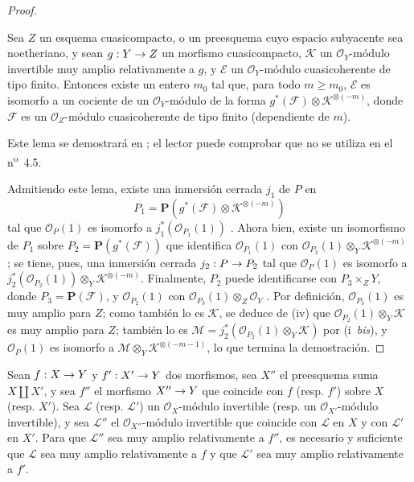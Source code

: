 \documentclass[oneside,10pt]{amsart}
\makeatletter
\renewcommand{\geq}{\geqslant}
\newcommand{\ega@arrow}[2]{\mathchoice{#1}{#2}{#2}{#2}}
\renewcommand{\to}{\ega@arrow{\longrightarrow}{\rightarrow}}
\newcommand{\oldpage}[2][]{\marginnote{\normalfont\footnotesize\textbf{#1}~|~#2}\ignorespaces}
\let\EGAOriginalLabel\label
\renewcommand{\label}[1]{\phantomsection\EGAOriginalLabel{#1}}
\makeatother
\begin{document}
\begin{proof}
\begin{lemma}[4.4.10.1]
\label{II.4.4.10.1-fr}
Sea $Z$ un esquema cuasicompacto, o un preesquema cuyo espacio subyacente sea noetheriano, y sean $g:Y\to Z$ un morfismo cuasicompacto, $\mathcal{K}$ un $\mathcal{O}_Y$-módulo invertible muy amplio relativamente a $g$, y $\mathcal{E}$ un $\mathcal{O}_Y$-módulo cuasicoherente de tipo finito.
Entonces existe un entero $m_0$ tal que, para todo $m\geq m_0$, $\mathcal{E}$ es isomorfo a un cociente de un $\mathcal{O}_Y$-módulo de la forma $g^*(\mathcal{F})\otimes\mathcal{K}^{\otimes(-m)}$, donde $\mathcal{F}$ es un $\mathcal{O}_Z$-módulo cuasicoherente de tipo finito (dependiente de $m$).
\end{lemma}

Este lema se demostrará en ;
el lector puede comprobar que  no se utiliza en el n\textsuperscript{o}~4.5.

\oldpage[II]{83}
Admitiendo este lema, existe una inmersión cerrada $j_1$ de $P$ en
\[
  P_1=\mathbf{P}(g^*(\mathcal{F})\otimes\mathcal{K}^{\otimes(-m)})
\]
tal que $\mathcal{O}_P(1)$ es isomorfo a $j_1^*(\mathcal{O}_{P_1}(1))$ .
Ahora bien, existe un isomorfismo de $P_1$ sobre $P_2=\mathbf{P}(g^*(\mathcal{F}))$ que identifica $\mathcal{O}_{P_1}(1)$ con $\mathcal{O}_{P_2}(1)\otimes_Y\mathcal{K}^{\otimes(-m)}$ ;
se tiene, pues, una inmersión cerrada $j_2:P\to P_2$ tal que $\mathcal{O}_P(1)$ es isomorfo a $j_2^*(\mathcal{O}_{P_2}(1))\otimes_Y\mathcal{K}^{\otimes(-m)}$.
Finalmente, $P_2$ puede identificarse con $P_3\times_ZY$, donde $P_3=\mathbf{P}(\mathcal{F})$, y $\mathcal{O}_{P_2}(1)$ con $\mathcal{O}_{P_3}(1)\otimes_Z\mathcal{O}_Y$ .
Por definición, $\mathcal{O}_{P_3}(1)$ es muy amplio para $Z$;
como también lo es $\mathcal{K}$, se deduce de (iv) que $\mathcal{O}_{P_2}(1)\otimes_Y\mathcal{K}$ es muy amplio para $Z$;
también lo es $\mathcal{M}=j_2^*(\mathcal{O}_{P_2}(1)\otimes_Y\mathcal{K})$ por (i~\emph{bis}), y $\mathcal{O}_P(1)$ es isomorfo a $\mathcal{M}\otimes_Y\mathcal{K}^{\otimes(-m-1)}$, lo que termina la demostración.
\end{proof}

\begin{proposition}[4.4.11]
\label{II.4.4.11-fr}
Sean $f:X\to Y$ y $f':X'\to Y$ dos morfismos, sea $X''$ el preesquema suma $X\amalg X'$, y sea $f''$ el morfismo $X''\to Y$ que coincide con $f$ \textup{(resp. $f'$)} sobre $X$ \textup{(resp. $X'$)}.
Sea $\mathcal{L}$ \textup{(resp. $\mathcal{L}'$)} un $\mathcal{O}_X$-módulo invertible \textup{(resp.} un $\mathcal{O}_{X'}$-módulo invertible\textup{)}, y sea $\mathcal{L}''$ el $\mathcal{O}_{X''}$-módulo invertible que coincide con $\mathcal{L}$ en $X$ y con $\mathcal{L}'$ en $X'$.
Para que $\mathcal{L}''$ sea muy amplio relativamente a $f''$, es necesario y suficiente que $\mathcal{L}$ sea muy amplio relativamente a $f$ y que $\mathcal{L}'$ sea muy amplio relativamente a $f'$.
\end{proposition}
\end{document}
